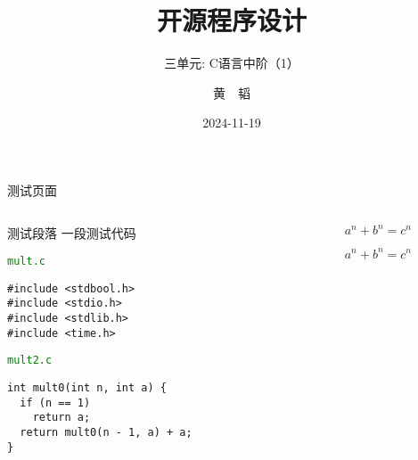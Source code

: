 \documentclass[
  9pt,
  ignorenonframetext,
  aspectratio=1610,
]{beamer}
\title{开源程序设计}
\subtitle{三单元: C语言中阶（1）}
\author{黄　韬}
\date{2024-11-19}
\institute{\href{mailto:taohonker@gmail.com}{\nolinkurl{taohonker@gmail.com}} \and 昆明理工大学·系统科学系}
\begin{document}
\titlepage


\begin{frame}[fragile]{测试页面}
\label{ux6d4bux8bd5ux9875ux9762}
\begin{columns}[T]
\begin{column}{0.6\linewidth}
\begin{block}{测试段落}
\label{ux6d4bux8bd5ux6bb5ux843d}
一段测试代码

\begin{listing}[H]
\caption*{\texttt{\textcolor{green}{mult.c}}}
\begin{verbatim}
#include <stdbool.h>
#include <stdio.h>
#include <stdlib.h>
#include <time.h>
\end{verbatim}
\end{listing}

\begin{listing}[H]
\caption*{\texttt{\textcolor{green}{mult2.c}}}
\begin{verbatim}
int mult0(int n, int a) {
  if (n == 1)
    return a;
  return mult0(n - 1, a) + a;
}
\end{verbatim}
\end{listing}
\end{block}
\end{column}

\begin{column}{0.3\linewidth}
\begin{tcolorbox}[enhanced jigsaw, opacitybacktitle=0.6, bottomrule=.15mm, breakable, leftrule=.75mm, colbacktitle=quarto-callout-note-color!10!white, coltitle=black, rightrule=.15mm, colframe=quarto-callout-note-color-frame, colback=white, bottomtitle=1mm, opacityback=0, title=\textcolor{quarto-callout-note-color}{\faInfo}\hspace{0.5em}{test callout}, titlerule=0mm, toptitle=1mm, arc=.35mm, left=2mm, toprule=.15mm]

\[
a^n + b^n = c^n
\]

\end{tcolorbox}

\[
a^n + b^n = c^n
\]
\end{column}
\end{columns}
\end{frame}
\end{document}
